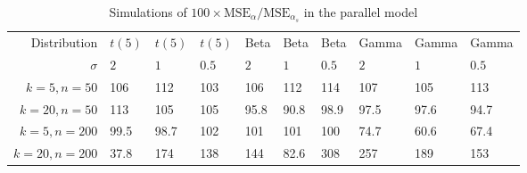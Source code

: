\begin{table}[ht]
\centering
\caption{Simulations of $100 \times \textrm{MSE}_\alpha/\textrm{MSE}_{\alpha_s}$ in the parallel model} 
\begin{tabular}{rlllllllll}
   Distribution & $t(5)$ & $t(5)$ & $t(5)$ & Beta & Beta & Beta & Gamma & Gamma & Gamma \\
 $\sigma$ & $2$ & $1$ & $0.5$ & $2$ & $1$ & $0.5$ & $2$ & $1$ & $0.5$ \\
$k = 5, n = 50$ & 106 & 112 & 103 & 106 & 112 & 114 & 107 & 105 & 113 \\ 
  $k = 20, n = 50$ & 113 & 105 & 105 & 95.8 & 90.8 & 98.9 & 97.5 & 97.6 & 94.7 \\ 
  $k = 5, n = 200$ & 99.5 & 98.7 & 102 & 101 & 101 & 100 & 74.7 & 60.6 & 67.4 \\ 
  $k = 20, n = 200$ & 37.8 & 174 & 138 & 144 & 82.6 & 308 & 257 & 189 & 153 \\ 
  \end{tabular}
\end{table}
\newcommand{\geomean}{1.08}
